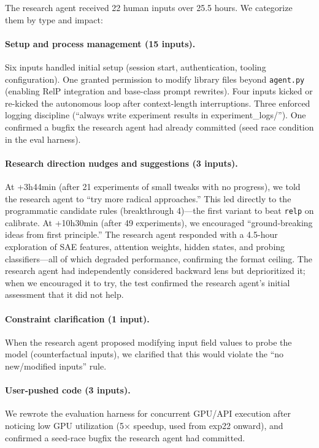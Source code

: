 \documentclass{article} %
\begin{document}
The research agent received 22 human inputs over 25.5 hours. We categorize them by type and impact:

\paragraph{Setup and process management (15 inputs).}
Six inputs handled initial setup (session start, authentication, tooling configuration).
One granted permission to modify library files beyond \texttt{agent.py} (enabling RelP integration and base-class prompt rewrites).
Four inputs kicked or re-kicked the autonomous loop after context-length interruptions.
Three enforced logging discipline (``always write experiment results in experiment\_logs/'').
One confirmed a bugfix the research agent had already committed (seed race condition in the eval harness).

\paragraph{Research direction nudges and suggestions (3 inputs).}
At +3h44min (after 21 experiments of small tweaks with no progress), we told the research agent to ``try more radical approaches.''
This led directly to the programmatic candidate rules (breakthrough 4)---the first variant to beat \texttt{relp} on calibrate.
At +10h30min (after 49 experiments), we encouraged ``ground-breaking ideas from first principle.''
The research agent responded with a 4.5-hour exploration of SAE features, attention weights, hidden states, and probing classifiers---all of which degraded performance, confirming the format ceiling.
The research agent had independently considered backward lens but deprioritized it; when we encouraged it to try, the test confirmed the research agent's initial assessment that it did not help.

\paragraph{Constraint clarification (1 input).}
When the research agent proposed modifying input field values to probe the model (counterfactual inputs), we clarified that this would violate the ``no new/modified inputs'' rule.

\paragraph{User-pushed code (3 inputs).}
We rewrote the evaluation harness for concurrent GPU/API execution after noticing low GPU utilization (5$\times$ speedup, used from exp22 onward), and confirmed a seed-race bugfix the research agent had committed.
\end{document}
